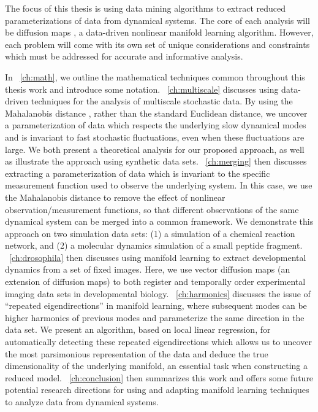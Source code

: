The focus of this thesis is using data mining algorithms to extract reduced parameterizations of data from dynamical systems.
%
The core of each analysis will be diffusion maps \citep{Coifman2006}, a data-driven nonlinear manifold learning algorithm.
%
However, each problem will come with its own set of unique considerations and constraints which must be addressed for accurate and informative analysis.

In \chap~\ref{ch:math}, we outline the mathematical techniques common throughout this thesis work and introduce some notation.
%
\chap~\ref{ch:multiscale} discusses using data-driven techniques for the analysis of multiscale stochastic data.
%
By using the Mahalanobis distance \cite{mahalanobis1936generalized}, rather than the standard Euclidean distance, we uncover a parameterization of data which respects the underlying slow dynamical modes and is invariant to fast stochastic fluctuations, even when these fluctuations are large.
%
We both present a theoretical analysis for our proposed approach, as well as illustrate the approach using synthetic data sets.
%
\chap~\ref{ch:merging} then discusses extracting a parameterization of data which is invariant to the specific measurement function used to observe the underlying system.
%
In this case, we use the Mahalanobis distance to remove the effect of nonlinear observation/measurement functions, so that different observations of the same dynamical system can be merged into a common framework.
%
We demonstrate this approach on two simulation data sets: (1) a simulation of a chemical reaction network, and (2) a molecular dynamics simulation of a small peptide fragment.
%
\chap~\ref{ch:drosophila} then discusses using manifold learning to extract developmental dynamics from a set of fixed images.
%
Here, we use vector diffusion maps (an extension of diffusion maps) to both register and temporally order experimental imaging data sets in developmental biology.
%
\chap~\ref{ch:harmonics} discusses the issue of ``repeated eigendirections'' in manifold learning, where subsequent modes can be higher harmonics of previous modes and parameterize the same direction in the data set.
%
We present an algorithm, based on local linear regression, for automatically detecting these repeated eigendirections which allows us to uncover the most parsimonious representation of the data and deduce the true dimensionality of the underlying manifold, an essential task when constructing a reduced model.
%
\chap~\ref{ch:conclusion} then summarizes this work and offers some future potential research directions for using and adapting manifold learning techniques to analyze data from dynamical systems. 